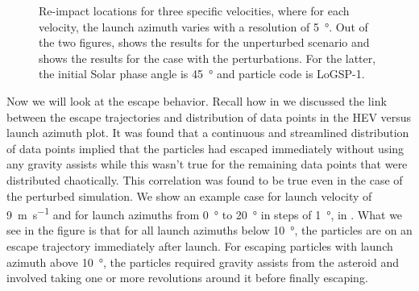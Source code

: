 \begin{figure}[htb]
\caption{Re-impact locations for three specific velocities, where for each velocity, the launch azimuth varies with a resolution of \SI{5}{\degree}. Out of the two figures, \protect{} shows the results for the unperturbed scenario and \protect{} shows the results for the case with the perturbations. For the latter, the initial Solar phase angle is \SI{45}{\degree} and particle code is LoGSP-1.}
\label{fig:specific_velocity_crashMap_noSP_spanalysis}
\end{figure}
\FloatBarrier
Now we will look at the escape behavior. Recall how in  we discussed the link between the escape trajectories and distribution of data points in the \gls{HEV} versus launch azimuth plot. It was found that a continuous and streamlined distribution of data points implied that the particles had escaped immediately without using any gravity assists while this wasn't true for the remaining data points that were distributed chaotically. This correlation was found to be true even in the case of the perturbed simulation. We show an example case for launch velocity of \SI{9}{\metre\per\second} and for launch azimuths from \SI{0}{\degree} to \SI{20}{\degree} in steps of \SI{1}{\degree}, in . What we see in the figure is that for all launch azimuths below \SI{10}{\degree}, the particles are on an escape trajectory immediately after launch. For escaping particles with launch azimuth above \SI{10}{\degree}, the particles required gravity assists from the asteroid and involved taking one or more revolutions around it before finally escaping.
